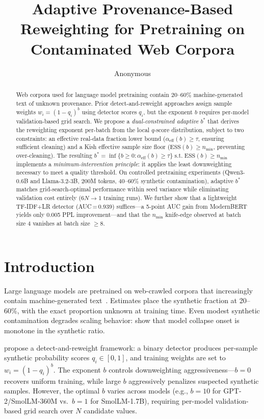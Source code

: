 \documentclass[11pt,a4paper]{article}
\title{Adaptive Provenance-Based Reweighting for Pretraining on Contaminated Web Corpora}
\author{Anonymous}
\newcommand{\bstar}{b^{*}}
\newcommand{\aeff}{\alpha_{\mathrm{eff}}}
\newcommand{\nmin}{n_{\min}}
\begin{document}
\maketitle

\begin{abstract}
Web corpora used for language model pretraining contain 20--60\% machine-generated text of unknown provenance.
Prior detect-and-reweight approaches assign sample weights $w_i=(1-q_i)^b$ using detector scores $q_i$, but the exponent $b$ requires per-model validation-based grid search.
We propose a \emph{dual-constrained adaptive} $\bstar$ that derives the reweighting exponent per-batch from the local $q$-score distribution, subject to two constraints: an effective real-data fraction lower bound ($\aeff(b)\geq\tau$, ensuring sufficient cleaning) and a Kish effective sample size floor ($\mathrm{ESS}(b)\geq\nmin$, preventing over-cleaning).
The resulting $\bstar=\inf\{b\geq 0:\aeff(b)\geq\tau\}\;\text{s.t.}\;\mathrm{ESS}(b)\geq\nmin$ implements a \emph{minimum-intervention principle}: it applies the least downweighting necessary to meet a quality threshold.
On controlled pretraining experiments (Qwen3-0.6B and Llama-3.2-3B, 200M tokens, 40--60\% synthetic contamination), adaptive $\bstar$ matches grid-search-optimal performance within seed variance while eliminating validation cost entirely (6$N\!\to\!1$ training runs).
We further show that a lightweight TF-IDF+LR detector (AUC\,=\,0.939) suffices---a 5-point AUC gain from ModernBERT yields only 0.005 PPL improvement---and that the $n_{\min}$ knife-edge observed at batch size 4 vanishes at batch size $\geq$8.
\end{abstract}

\section{Introduction}
\label{sec:intro}

Large language models are pretrained on web-crawled corpora that increasingly contain machine-generated text~\citep{strong-collapse-iclr2025}.
Estimates place the synthetic fraction at 20--60\%, with the exact proportion unknown at training time.
Even modest synthetic contamination degrades scaling behavior: \citet{strong-collapse-iclr2025} show that model collapse onset is monotone in the synthetic ratio.

\citet{drayson-emnlp2025} propose a detect-and-reweight framework: a binary detector produces per-sample synthetic probability scores $q_i\in[0,1]$, and training weights are set to $w_i=(1-q_i)^b$.
The exponent $b$ controls downweighting aggressiveness---$b\!=\!0$ recovers uniform training, while large $b$ aggressively penalizes suspected synthetic samples.
However, the optimal $b$ varies across models (e.g., $b\!=\!10$ for GPT-2/SmolLM-360M vs.\ $b\!=\!1$ for SmolLM-1.7B), requiring per-model validation-based grid search over $N$ candidate values.
\end{document}
